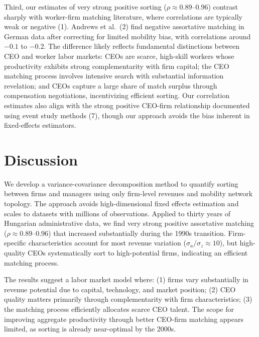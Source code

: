 \documentclass[9pt,twocolumn,twoside]{pnas-new}
\begin{document}
Third, our estimates of very strong positive sorting ($\rho \approx 0.89$--0.96) contrast sharply with worker-firm matching literature, where correlations are typically weak or negative (1). Andrews et al.\ (2) find negative assortative matching in German data after correcting for limited mobility bias, with correlations around $-0.1$ to $-0.2$. The difference likely reflects fundamental distinctions between CEO and worker labor markets: CEOs are scarce, high-skill workers whose productivity exhibits strong complementarity with firm capital; the CEO matching process involves intensive search with substantial information revelation; and CEOs capture a large share of match surplus through compensation negotiations, incentivizing efficient sorting. Our correlation estimates also align with the strong positive CEO-firm relationship documented using event study methods (7), though our approach avoids the bias inherent in fixed-effects estimators.

\section*{Discussion}

We develop a variance-covariance decomposition method to quantify sorting between firms and managers using only firm-level revenues and mobility network topology. The approach avoids high-dimensional fixed effects estimation and scales to datasets with millions of observations. Applied to thirty years of Hungarian administrative data, we find very strong positive assortative matching ($\rho \approx 0.89$--0.96) that increased substantially during the 1990s transition. Firm-specific characteristics account for most revenue variation ($\sigma_a/\sigma_z \approx 10$), but high-quality CEOs systematically sort to high-potential firms, indicating an efficient matching process.

The results suggest a labor market model where: (1) firms vary substantially in revenue potential due to capital, technology, and market position; (2) CEO quality matters primarily through complementarity with firm characteristics; (3) the matching process efficiently allocates scarce CEO talent. The scope for improving aggregate productivity through better CEO-firm matching appears limited, as sorting is already near-optimal by the 2000s.

\end{document}
